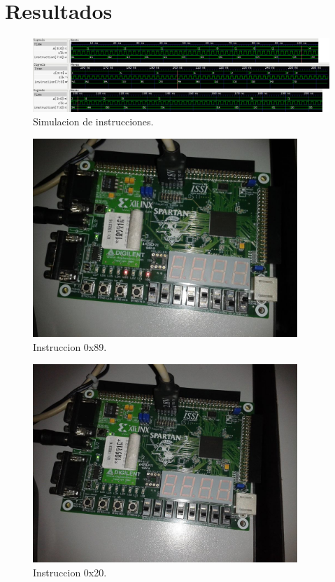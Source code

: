 \documentclass[11pt,letterpaper]{article} %
\begin{document}
\section{Resultados}
\begin{figure}[H]
  \centering
  \includegraphics[width=15cm]{figures/sim.png}
  \caption{Simulacion de instrucciones.}
\end{figure}
\begin{figure}[H]
  \centering
  \includegraphics[width=10cm]{figures/2.jpg}
  \caption{Instruccion 0x89.}
\end{figure}
\begin{figure}[H]
  \centering
  \includegraphics[width=10cm]{figures/4.jpg}
  \caption{Instruccion 0x20.}
\end{figure}
\end{document}
